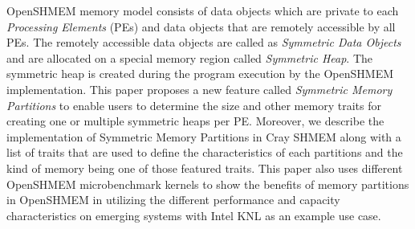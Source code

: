 OpenSHMEM memory model consists of data objects which are private
to each \emph{Processing Elements} (PEs) and data objects that are
remotely accessible by all PEs. The remotely accessible data objects
are called as \emph{Symmetric Data Objects} and are allocated on a
special memory region called \emph{Symmetric Heap}. The symmetric heap
is created during the program execution by the OpenSHMEM implementation.
This paper proposes a new feature called \emph{Symmetric Memory
Partitions} to enable users to determine the size and other memory
traits for creating one or multiple symmetric heaps per PE. Moreover,
we describe the implementation of Symmetric Memory Partitions in
Cray SHMEM along with a list of traits that are used to define the
characteristics of each partitions and the kind of memory being one of
those featured traits. This paper also uses different OpenSHMEM
microbenchmark kernels to show the benefits of memory partitions in
OpenSHMEM in utilizing the different performance and capacity
characteristics on emerging systems with Intel KNL as an example use
case.